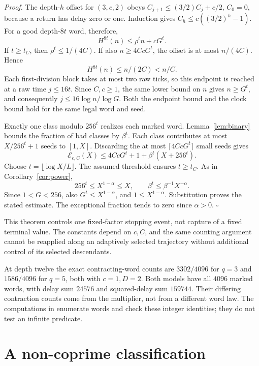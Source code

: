 \documentclass[11pt,letterpaper]{article}
\newenvironment{proof}{\noindent\textit{Proof.}}{\hfill\(\square\)}
\begin{document}
\begin{proof}
The depth-\(h\) offset for \((3,c,2)\) obeys
\(C_{j+1}\le(3/2)C_j+c/2\), \(C_0=0\), because a return has delay
zero or one. Induction gives
\(C_h\le c((3/2)^h-1)\). For a good depth-\(8t\) word, therefore,
\[
H^{8t}(n)\le\rho^t n+cG^t.
\]
If \(t\ge t_C\), then \(\rho^t\le1/(4C)\). If also
\(n\ge4CcG^t\), the offset is at most \(n/(4C)\). Hence
\[
H^{8t}(n)\le n/(2C)<n/C.
\]
Each first-division block takes at most two raw ticks, so this endpoint
is reached at a raw time \(j\le16t\). Since \(C,c\ge1\), the same
lower bound on \(n\) gives \(n\ge G^t\), and consequently
\(j\le16\log n/\log G\). Both the endpoint bound and the clock bound
hold for the same legal word and seed.

Exactly one class modulo \(256^t\) realizes each marked word.
Lemma~\ref{lem:binary} bounds the fraction of bad classes by \(\beta^t\).
Each class contributes at most \(X/256^t+1\) seeds to \([1,X]\).
Discarding the at most \(\lceil4CcG^t\rceil\) small seeds gives
\[
\mathcal E_{c,C}(X)
\le 4CcG^t+1+\beta^t(X+256^t).
\]
Choose \(t=\lfloor\log X/L\rfloor\). The assumed threshold ensures
\(t\ge t_C\). As in Corollary~\ref{cor:power},
\[
256^t\le X^{1-\alpha}\le X,
\qquad \beta^t\le\beta^{-1}X^{-\alpha}.
\]
Since \(1<G<256\), also \(G^t\le X^{1-\alpha}\), and
\(1\le X^{1-\alpha}\). Substitution proves the stated estimate.
The exceptional fraction tends to zero since \(\alpha>0\).
\end{proof}

This theorem controls one fixed-factor stopping event, not capture of a
fixed terminal value. The constants depend on \(c,C\), and the same
counting argument cannot be reapplied along an adaptively selected
trajectory without additional control of its selected descendants.

At depth twelve the exact contracting-word counts are \(3302/4096\)
for \(q=3\) and \(1586/4096\) for \(q=5\), both with \(c=1,D=2\).
Both models have all \(4096\) marked words, with delay sum \(24576\)
and squared-delay sum \(159744\). Their differing contraction counts
come from the multiplier, not from a different word law.
The computations in \cite{BoundaryCode26} enumerate words and check
these integer identities; they do not test an infinite predicate.

\section{A non-coprime classification}
\end{document}
